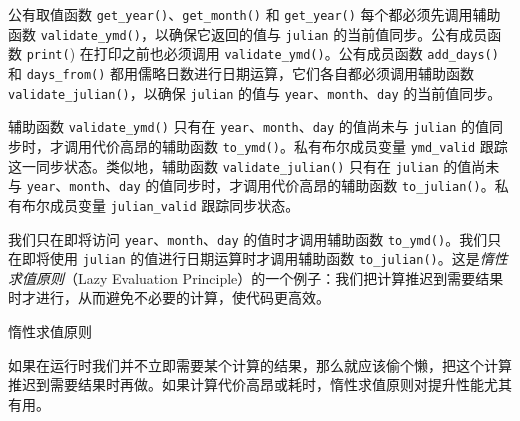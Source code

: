 \par
{}\par
{}\par
{}\par
{}\par

公有取值函数 \texttt{get\_\allowbreak{}year(\allowbreak{})\allowbreak{}}、\texttt{get\_\allowbreak{}month(\allowbreak{})\allowbreak{}} 和 \texttt{get\_\allowbreak{}year(\allowbreak{})\allowbreak{}} 每个都必须先调用辅助函数 \texttt{validate\_\allowbreak{}ymd(\allowbreak{})\allowbreak{}}，以确保它返回的值与 \texttt{julian} 的当前值同步。公有成员函数 \texttt{print(}) 在打印之前也必须调用 \texttt{validate\_\allowbreak{}ymd(\allowbreak{})\allowbreak{}}。公有成员函数 \texttt{add\_\allowbreak{}days(\allowbreak{})\allowbreak{}} 和 \texttt{days\_\allowbreak{}from(\allowbreak{})\allowbreak{}} 都用儒略日数进行日期运算，它们各自都必须调用辅助函数 \texttt{validate\_\allowbreak{}julian(\allowbreak{})\allowbreak{}}，以确保 \texttt{julian} 的值与 \texttt{year}、\texttt{month}、\texttt{day} 的当前值同步。

辅助函数 \texttt{validate\_\allowbreak{}ymd(\allowbreak{})\allowbreak{}} 只有在 \texttt{year}、\texttt{month}、\texttt{day} 的值尚未与 \texttt{julian} 的值同步时，才调用代价高昂的辅助函数 \texttt{to\_ymd()}。私有布尔成员变量 \texttt{ymd\_\allowbreak{}valid} 跟踪这一同步状态。类似地，辅助函数 \texttt{validate\_\allowbreak{}julian(\allowbreak{})\allowbreak{}} 只有在 \texttt{julian} 的值尚未与 \texttt{year}、\texttt{month}、\texttt{day} 的值同步时，才调用代价高昂的辅助函数 \texttt{to\_\allowbreak{}julian(\allowbreak{})\allowbreak{}}。私有布尔成员变量 \texttt{julian\_\allowbreak{}valid} 跟踪同步状态。

我们只在即将访问 \texttt{year}、\texttt{month}、\texttt{day} 的值时才调用辅助函数 \texttt{to\_ymd()}。我们只在即将使用 \texttt{julian} 的值进行日期运算时才调用辅助函数 \texttt{to\_\allowbreak{}julian(\allowbreak{})\allowbreak{}}。这是\emph{惰性求值原则}（Lazy Evaluation Principle）的一个例子：我们把计算推迟到需要结果时才进行，从而避免不必要的计算，使代码更高效。

\begin{mySidebar}{惰性求值原则}

如果在运行时我们并不立即需要某个计算的结果，那么就应该偷个懒，把这个计算推迟到需要结果时再做。如果计算代价高昂或耗时，惰性求值原则对提升性能尤其有用。
\end{mySidebar}

